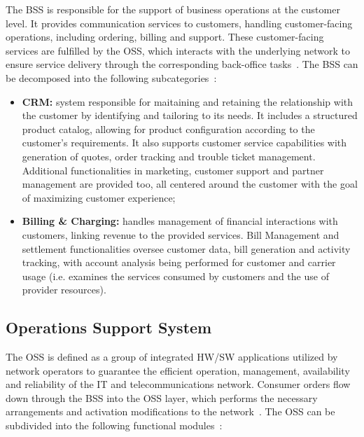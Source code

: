 The \acf{BSS} is responsible for the support of business operations at the customer level. It provides communication services to customers, handling customer-facing operations, including ordering, billing and support. These customer-facing services are fulfilled by the \acs{OSS}, which interacts with the underlying network to ensure service delivery through the corresponding back-office tasks~\cite{CommunicationManagamentPlanOSSCaseStudy}. The \acs{BSS} can be decomposed into the following subcategories~\cite{NGOSSEvolutionTelecomSP}:
\begin{itemize}
    \item \textbf{\acf{CRM}:} system responsible for maitaining and retaining the relationship with the customer by identifying and tailoring to its needs. It includes a structured product catalog, allowing for product configuration according to the customer's requirements. It also supports customer service capabilities with generation of quotes, order tracking and trouble ticket management. Additional functionalities in marketing, customer support and partner management are provided too, all centered around the customer with the goal of maximizing customer experience;

    \item \textbf{Billing \& Charging:} handles management of financial interactions with customers, linking revenue to the provided services. Bill Management and settlement functionalities oversee customer data, bill generation and activity tracking, with account analysis being performed for customer and carrier usage (i.e. examines the services consumed by customers and the use of provider resources).
\end{itemize}


\subsection{Operations Support System}

The \acf{OSS} is defined as a group of integrated \acs{HW}/\acs{SW} applications utilized by network operators to guarantee the efficient operation, management, availability and reliability of the \acs{IT} and telecommunications network. Consumer orders flow down through the \acs{BSS} into the \acs{OSS} layer, which performs the necessary arrangements and activation modifications to the network~\citep{OSSMobileNetworks,CommunicationManagamentPlanOSSCaseStudy}. The \acs{OSS} can be subdivided into the following functional modules~\citep{OSSMobileNetworks, NGOSSEvolutionTelecomSP}:

